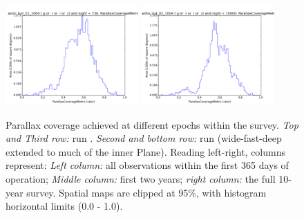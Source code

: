 \begin{figure}[ht]
\begin{center}
  \includegraphics[width=2.0in]{./figs/milkyway/astromPanels/MW_Astrom_paCovge_wfdPlane_02y_hst.png}
  \includegraphics[width=2.0in]{./figs/milkyway/astromPanels/MW_Astrom_paCovge_wfdPlane_10y_hst.png}
  \end{center}
  \caption{Parallax coverage achieved at different epochs within the survey. {\it Top and Third row:} \OpSim run . {\it Second and bottom row:} \OpSim run  (wide-fast-deep extended to much of the inner Plane). Reading left-right, columns represent: {\it Left column:} all observations within the first 365 days of operation; {\it Middle column:} first two years; {\it right column:} the full 10-year survey. Spatial maps are clipped at 95\%, with histogram horizontal limits (0.0 - 1.0).}
  \label{fig_astrom_ByTime_PACoverage}
\end{figure}

